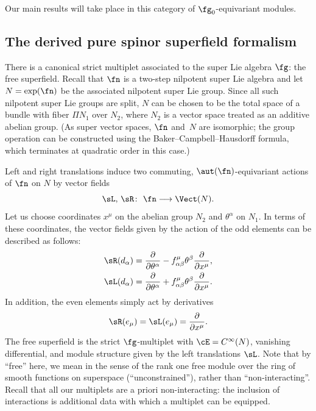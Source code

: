 Our main results will take place in this category of $\fg_0$-equivariant modules.

\subsection{The derived pure spinor superfield formalism}

There is a canonical strict multiplet associated to the super Lie algebra $\fg$: the free superfield. Recall that $\fn$ is a two-step nilpotent super Lie algebra and let $N = \exp(\fn)$ be the associated nilpotent super Lie group. Since all such nilpotent super Lie groups are split, $N$ can be chosen to be the total space of a bundle with fiber $\Pi N_1$ over $N_2$, where $N_2$ is a vector space treated as an additive abelian group. (As super vector spaces, $\fn$ and~$N$ are isomorphic; the group operation can be constructed using the Baker--Campbell--Hausdorff formula, which terminates at quadratic order in this case.)

Left and right translations induce two commuting, $\aut(\fn)$-equivariant actions of $\fn$ on $N$ by vector fields
\begin{equation*}
\sL,\, \sR \colon \ \fn \longrightarrow \Vect(N) .
\end{equation*}
Let us choose coordinates $x^\mu$ on the abelian group $N_2$
and $\theta^\alpha$ on $N_1$. In terms of these coordinates, the vector fields given by the action of the odd elements can be described as follows:
\begin{equation*}
\begin{split}
\sR(d_\alpha) &= \frac{\partial}{\partial \theta^\alpha} - f^\mu_{\alpha \beta} \theta^\beta \frac{\partial}{\partial x^\mu}, \\
\sL(d_\alpha) &= \frac{\partial}{\partial \theta^\alpha} + f^\mu_{\alpha \beta} \theta^\beta \frac{\partial}{\partial x^\mu}.
\end{split}
\end{equation*}
In addition, the even elements simply act by derivatives
\begin{equation*}
\sR(e_\mu) = \sL(e_\mu) = \frac{\partial}{\partial x^\mu}.
\end{equation*}
The free superfield is the strict $\fg$-multiplet with $\cE = C^\infty(N)$, vanishing differential, and module structure given by the left translations $\sL$. Note that by ``free'' here, we mean in the sense of the rank one free module over the ring of smooth functions on superspace (``unconstrained''), rather than ``non-interacting''. Recall that all our multiplets are a priori non-interacting: the inclusion of interactions is additional data with which a multiplet can be equipped.


